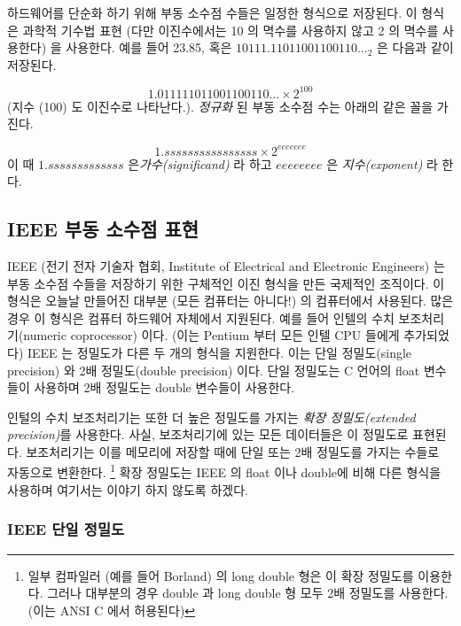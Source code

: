 하드웨어를 단순화 하기 위해 부동 소수점 수들은 일정한 형식으로 저장된다. 이 형식은
과학적 기수법 표현 (다만 이진수에서는 10 의 멱수를 사용하지 않고 2 의 멱수를 사용한다)
을 사용한다. 예를 들어 23.85, 혹은 $10111.11011001100110\ldots_2$ 은 다음과 같이
저장된다. 

\[ 1.011111011001100110\ldots \times 2^{100} \]
(지수 (100) 도 이진수로 나타난다.). \emph{정규화} 된 부동 소수점 수는
아래의 같은 꼴을 가진다. 

\[ 1.ssssssssssssssss \times 2^{eeeeeee} \]
이 때 $1.sssssssssssss$ 은\emph{가수(significand)} 라 하고 $eeeeeeee$ 은 
\emph{지수(exponent)} 라 한다. 

\subsection{IEEE 부동 소수점 표현}

IEEE (전기 전자 기술자 협회, Institute of Electrical and Electronic Engineers) 는 
부동 소수점 수들을 저장하기 위한 구체적인 이진 형식을 만든 국제적인 조직이다.
이 형식은 오늘날 만들어진 대부분 (모든 컴퓨터는 아니다!) 의 컴퓨터에서 사용된다. 
많은 경우 이 형식은 컴퓨터 하드웨어 자체에서 지원된다. 예를 들어 인텔의 수치
보조처리기(numeric coprocessor) 이다. (이는 Pentium 부터 모든 인텔 CPU 들에게
추가되었다) IEEE 는 정밀도가 다른 두 개의 형식을 지원한다. 이는 단일 정밀도(single precision)
와 2배 정밀도(double precision) 이다. 단일 정밀도는 C 언어의 {\code float} 변수들이
사용하며 2배 정밀도는 {\code double} 변수들이 사용한다.

인털의 수치 보조처리기는 또한 더 높은 정밀도를 가지는 \emph{확장 정밀도(extended precision)}를
사용한다. 사실, 보조처리기에 있는 모든 데이터들은 이 정밀도로 표현된다. 보조처리기는
이를 메모리에 저장할 때에 단일 또는 2배 정밀도를 가지는 수들로 자동으로 변환한다.
\footnote{ 일부 컴파일러 (예를 들어 Borland) 의 {\code long double} 형은 이 확장 정밀도를
이용한다. 그러나 대부분의 경우 {\code double} 과 {\code long double} 형 모두 
2배 정밀도를 사용한다. (이는 ANSI C 에서 허용된다)} 확장 정밀도는 IEEE 의 float 이나 double에 비해
다른 형식을 사용하며 여기서는 이야기 하지 않도록 하겠다. 

\subsubsection{IEEE 단일 정밀도}

